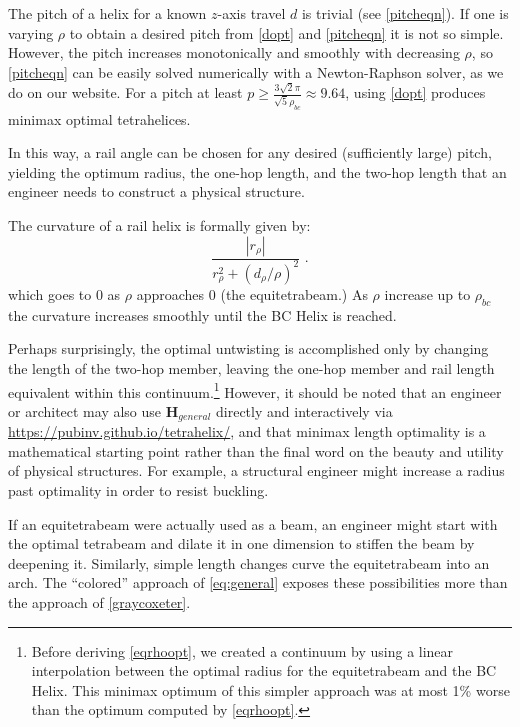 \documentclass[twocolumn,10pt]{asme2ej}
\renewcommand{\vec}[1]{\mathbf{#1}}
\begin{document}
 The pitch of a helix for a known $z$-axis travel $d$
 is trivial (see \cref{pitcheqn}).
If one is varying $\rho$ to obtain a desired pitch
from \cref{dopt} and \cref{pitcheqn} it is not so simple.
However, the pitch increases monotonically and smoothly with decreasing $\rho$, so
\cref{pitcheqn} can be easily solved numerically with a Newton-Raphson
solver, as we do on our website.
For a pitch at least $ p \geq \frac{3  \sqrt{2}  \pi}{\sqrt{5}\rho_{bc}} \approx 9.64 $,
using \cref{dopt} produces minimax optimal tetrahelices.

In this way, a rail angle can be chosen for any desired (sufficiently large) pitch, yielding
the optimum radius, the one-hop length, and the two-hop length that an engineer needs to
construct a physical structure.

The curvature of a rail helix is formally given by:
\begin{equation}
  \frac{|r_{\rho}|}{r_{\rho}^2 + (d_{\rho}/\rho)^2} \text{ .}
\end{equation}
which goes to $0$ as $\rho$ approaches $0$ (the equitetrabeam.)
As $\rho$ increase up to $\rho_{bc}$ the curvature increases smoothly until the BC Helix is reached.

Perhaps surprisingly, the optimal untwisting is accomplished only by
changing the length of the two-hop member, leaving the one-hop member
and rail length equivalent within this continuum.\footnote{Before
deriving  \cref{eqrhoopt}, we created a continuum by
using a linear interpolation between the optimal radius for the
equitetrabeam and the BC Helix. This minimax optimum of this simpler
approach was at most 1\% worse than the optimum computed by
\cref{eqrhoopt}.}
 However, it should
be noted that an engineer or architect may also use $\vec{H}_{general}$ 
directly and interactively via \url{https://pubinv.github.io/tetrahelix/},
and that minimax length optimality is a
mathematical starting point rather than the final word on the beauty and utility of
physical structures. For example, a structural engineer might increase a
radius past optimality in order to resist buckling.

If an equitetrabeam were actually
used as a beam, an engineer might start with the optimal tetrabeam and
dilate it in one dimension to stiffen the beam by deepening it. Similarly, simple
length changes curve the equitetrabeam into an arch.
The ``colored'' approach of  \cref{eq:general} exposes these possibilities
more than the approach of  \cref{graycoxeter}.
\end{document}
